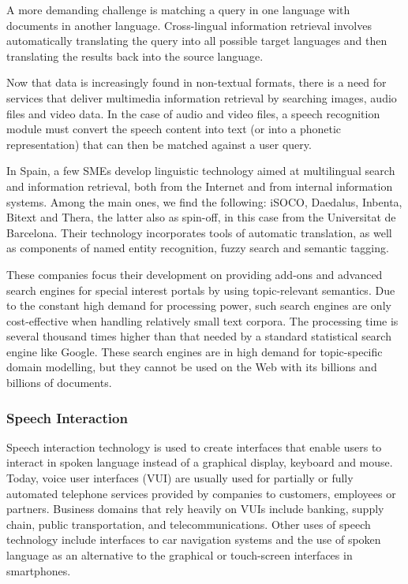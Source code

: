 \begin{multicols}{2}
A more demanding challenge is matching a query in one language with documents in another language. Cross-lingual information retrieval involves automatically translating the query into all possible target languages and then translating the results back into the source language. 

Now that data is increasingly found in non-textual formats, there is a need for services that deliver multimedia information retrieval by searching images, audio files and video data. In the case of audio and video files, a speech recognition module must convert the speech content into text (or into a phonetic representation) that can then be matched against a user query.

In Spain, a few SMEs develop linguistic technology aimed at multilingual search and information retrieval, both from the Internet and from internal information systems. Among the main ones, we find the following: iSOCO, Daedalus, Inbenta, Bitext  and Thera, the latter also as spin-off, in this case from the Universitat de Barcelona. Their technology incorporates tools of automatic translation, as well as components of named entity recognition, fuzzy search and semantic tagging.

These companies focus their development on providing add-ons and advanced search engines for special interest portals by using topic-relevant semantics. Due to the constant high demand for processing power, such search engines are only cost-effective when handling relatively small text corpora. The processing time is several thousand times higher than that needed by a standard statistical search engine like Google. These search engines are in high demand for topic-specific domain modelling, but they cannot be used on the Web with its billions and billions of documents.

\subsubsection{Speech Interaction}

Speech interaction technology is used to create interfaces that enable users to interact in spoken language instead of a graphical display, keyboard and mouse. Today, voice user interfaces (VUI) are usually used for partially or fully automated telephone services provided by companies to customers, employees or partners. Business domains that rely heavily on VUIs include banking, supply chain, public transportation, and telecommunications. Other uses of speech technology include interfaces to car navigation systems and the use of spoken language as an alternative to the graphical or touch-screen interfaces in smartphones. 


\end{multicols}
